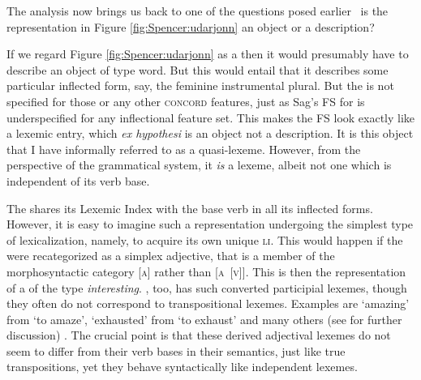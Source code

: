 \documentclass[output=paper]{langsci/langscibook}
\begin{document}
The analysis now brings us back to one of the questions posed earlier \textemdash\ is the representation in Figure \ref{fig:Spencer:udarjonn} an object or a description?

If we regard Figure \ref{fig:Spencer:udarjonn} as a  then it would presumably have to describe an object of type \textsf{word}. But this would entail that it describes some particular inflected form, say, the feminine instrumental plural. But the  is not specified for those or any other \textsc{concord} features, just as Sag's FS for  is underspecified for any inflectional feature set. This makes the  FS look exactly like a lexemic entry, which \emph{ex hypothesi} is an object not a description. It is this object that I have informally referred to as a quasi-lexeme. However, from the perspective of the grammatical system, it \emph{is} a lexeme, albeit not one which is independent of its verb base.

The  shares its Lexemic Index with the base verb in all its inflected forms. However, it is easy to imagine such a representation undergoing the simplest type of lexicalization, namely, to acquire its own unique \textsc{li}. This would happen if the  were recategorized as a simplex adjective, that is a member of the morphosyntactic category \textsc{[a]} rather than \textsc{[a~[v]]}. This is then the representation of a  of the type \emph{interesting}. , too, has such converted participial lexemes, though they often do not correspond to  transpositional lexemes. Examples are  `amazing' from    `to amaze',  `exhausted' from  `to exhaust' and many others %
(see %
\citealt{Spencer17:Russptcps} %
%
 for further discussion)
%
. The crucial point is that these derived adjectival lexemes do not seem to differ from their verb bases in their semantics, just like true transpositions, yet they behave syntactically like independent lexemes.


\end{document}
